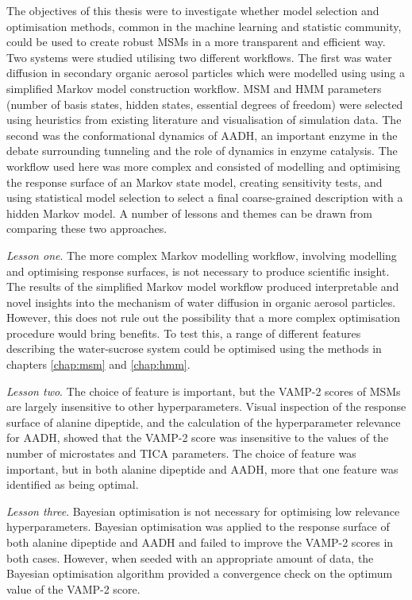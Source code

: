 The objectives of this thesis were to investigate whether model selection and optimisation methods,  common in the machine learning and statistic community,  could be used to create robust MSMs in a more transparent and efficient way.  Two systems were studied utilising two different workflows. The first was water diffusion in secondary organic aerosol particles which were modelled using using a simplified Markov model construction workflow. MSM and HMM parameters (number of basis states, hidden states, essential degrees of freedom) were selected using heuristics from existing literature and visualisation of simulation data. The second was the conformational dynamics of AADH, an important enzyme in the debate surrounding tunneling and the role of dynamics in enzyme catalysis.  The workflow used here was more complex and consisted of modelling and optimising the response surface of an Markov state model, creating sensitivity tests, and using statistical model selection to select a final coarse-grained description with a hidden Markov model.  A number of lessons and themes can be drawn from comparing these two approaches. 

\emph{Lesson one}. The more complex Markov modelling workflow, involving modelling and optimising response surfaces, is not necessary to produce scientific insight. The results of the simplified Markov model workflow produced interpretable and novel insights into the mechanism of water diffusion in organic aerosol particles. However, this does not rule out the possibility that a more complex optimisation procedure would bring benefits. To test this, a range of different features describing the water-sucrose system could be optimised using the methods in chapters \ref{chap:msm} and  \ref{chap:hmm}.  

\emph{Lesson two}. The choice of feature is important, but the VAMP-2 scores of MSMs are largely insensitive to other hyperparameters.  Visual inspection of the response surface of alanine dipeptide, and the calculation of the hyperparameter relevance for AADH, showed that the VAMP-2 score was insensitive to the values of the number of microstates and TICA parameters. The choice of feature was important, but in both alanine dipeptide and AADH, more that one feature was identified as being  optimal.  

\emph{Lesson three}.  Bayesian optimisation is not necessary for optimising low relevance hyperparameters.  Bayesian optimisation was applied to the response surface of both alanine dipeptide and AADH and failed to improve the VAMP-2 scores in both cases. However, when seeded with an appropriate amount of data, the Bayesian optimisation algorithm provided a convergence check on the optimum value of the VAMP-2 score.  

